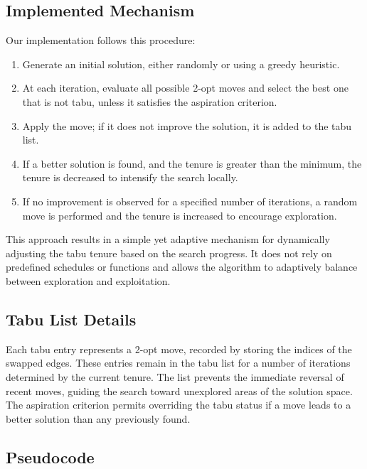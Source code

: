 \subsection{Implemented Mechanism}

Our implementation follows this procedure:

\begin{enumerate}
    \item Generate an initial solution, either randomly or using a greedy heuristic.
    \item At each iteration, evaluate all possible 2-opt moves and select the best one that is not tabu, unless it satisfies the aspiration criterion.
    \item Apply the move; if it does not improve the solution, it is added to the tabu list.
    \item If a better solution is found, and the tenure is greater than the minimum, the tenure is decreased to intensify the search locally.
    \item If no improvement is observed for a specified number of iterations, a random move is performed and the tenure is increased to encourage exploration.
\end{enumerate}

This approach results in a simple yet adaptive mechanism for dynamically adjusting the tabu tenure based on the search progress. It does not rely on predefined schedules or functions and allows the algorithm to adaptively balance between exploration and exploitation.

\subsection{Tabu List Details}

Each tabu entry represents a 2-opt move, recorded by storing the indices of the swapped edges. These entries remain in the tabu list for a number of iterations determined by the current tenure. The list prevents the immediate reversal of recent moves, guiding the search toward unexplored areas of the solution space. The aspiration criterion permits overriding the tabu status if a move leads to a better solution than any previously found.

\subsection{Pseudocode}

